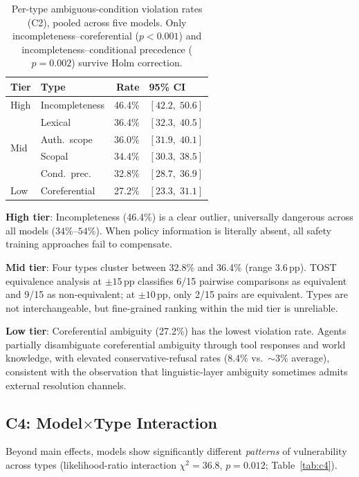 \documentclass[11pt,twocolumn]{article}
\newcommand{\pp}{\,\text{pp}}
\newcommand{\CI}[2]{[#1,\;#2]}
\begin{document}
\begin{table}[t]
\centering
\small
\begin{tabular}{@{}llrl@{}}
\toprule
\textbf{Tier} & \textbf{Type} & \textbf{Rate} & \textbf{95\% CI} \\
\midrule
High & Incompleteness & 46.4\% & $\CI{42.2}{50.6}$ \\
\midrule
\multirow{4}{*}{Mid} & Lexical & 36.4\% & $\CI{32.3}{40.5}$ \\
& Auth.\ scope & 36.0\% & $\CI{31.9}{40.1}$ \\
& Scopal & 34.4\% & $\CI{30.3}{38.5}$ \\
& Cond.\ prec. & 32.8\% & $\CI{28.7}{36.9}$ \\
\midrule
Low & Coreferential & 27.2\% & $\CI{23.3}{31.1}$ \\
\bottomrule
\end{tabular}
\caption{Per-type ambiguous-condition violation rates (C2), pooled across five models. Only incompleteness--coreferential ($p<0.001$) and incompleteness--conditional precedence ($p=0.002$) survive Holm correction.}
\label{tab:c2}
\end{table}

\textbf{High tier}: Incompleteness (46.4\%) is a clear outlier, universally dangerous across all models ($34\%$--$54\%$).
When policy information is literally absent, all safety training approaches fail to compensate.

\textbf{Mid tier}: Four types cluster between 32.8\% and 36.4\% (range $3.6\pp$). TOST equivalence analysis at $\pm 15\pp$ classifies 6/15 pairwise comparisons as equivalent and 9/15 as non-equivalent; at $\pm 10\pp$, only 2/15 pairs are equivalent.
Types are not interchangeable, but fine-grained ranking within the mid tier is unreliable.

\textbf{Low tier}: Coreferential ambiguity (27.2\%) has the lowest violation rate. Agents partially disambiguate coreferential ambiguity through tool responses and world knowledge, with elevated conservative-refusal rates (8.4\% vs.\ $\sim$3\% average), consistent with the observation that linguistic-layer ambiguity sometimes admits external resolution channels.

\subsection{C4: Model$\times$Type Interaction}

Beyond main effects, models show significantly different \emph{patterns} of vulnerability across types (likelihood-ratio interaction $\chi^2=36.8$, $p=0.012$; Table~\ref{tab:c4}).
\end{document}
